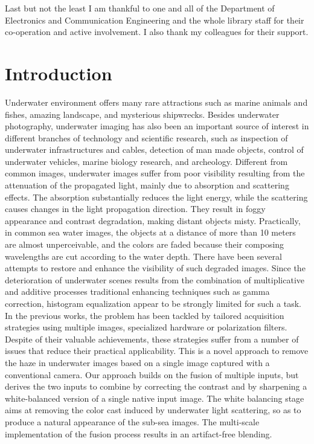 \documentclass[hidelinks, 12pt]{report}
\begin{document}

Last but not the least I am thankful to one and all of the Department of Electronics and Communication Engineering and the whole library staff for their co-operation and active involvement.
I also thank my colleagues for their support.
\hbox{} \newpage 
{} 
\pagestyle{fancy}
\chapter{Introduction}
\justify
Underwater environment offers many rare attractions such as marine animals and fishes, amazing landscape, and mysterious shipwrecks. Besides underwater photography, underwater imaging has also been an important source of interest in different branches of technology and scientific research, such as inspection of underwater infrastructures and cables, detection of man made objects, control of underwater vehicles, marine biology research, and archeology. Different from common images, underwater images suffer from poor visibility resulting from the attenuation of the propagated light, mainly due to absorption and scattering effects. The absorption substantially reduces the light energy, while the scattering causes changes in the light propagation direction. They result in foggy appearance and contrast degradation, making distant objects misty. Practically, in common sea water images, the objects at a distance of more than 10 meters are almost unperceivable, and the colors are faded because their composing wavelengths are cut according to the water depth. There have been several attempts to restore and enhance the visibility of such degraded images. Since the deterioration of underwater scenes results from the combination of multiplicative and additive processes traditional enhancing techniques such as gamma correction, histogram equalization appear to be strongly limited for such a task. In the previous works, the problem has been tackled by tailored acquisition strategies using multiple images, specialized hardware or polarization filters. Despite of their valuable achievements, these strategies suffer from a number of issues that reduce their practical applicability. This is a novel approach to remove the haze in underwater images based on a single image captured with a conventional camera. Our approach builds on the fusion of multiple inputs, but derives the two inputs to combine by correcting the contrast and by sharpening a white-balanced version of a single native input image. The white balancing stage aims at removing the color cast induced by underwater light scattering, so as to produce a natural appearance of the sub-sea images. The multi-scale implementation of the fusion process results in an artifact-free blending.
\end{document}
